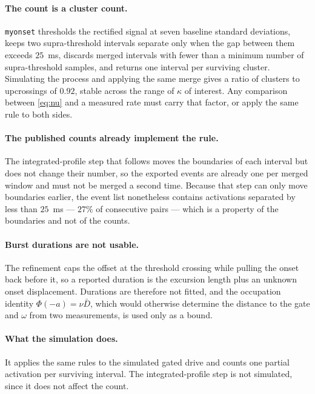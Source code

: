 \documentclass[a4paper,11pt]{article}
\newcommand{\1}{\mathbbm{1}}
\begin{document}
\paragraph{The count is a cluster count.} \texttt{myonset} thresholds the rectified
signal at seven baseline standard deviations, keeps two supra-threshold intervals
separate only when the gap between them exceeds $25$~ms, discards merged intervals with
fewer than a minimum number of supra-threshold samples, and returns one interval per
surviving cluster. Simulating the process and applying the same merge gives a ratio of
clusters to upcrossings of $0.92$, stable across the range of $\kappa$ of interest. Any
comparison between \eqref{eq:nu} and a measured rate must carry that factor, or apply the
same rule to both sides.

\paragraph{The published counts already implement the rule.} The integrated-profile step
that follows moves the boundaries of each interval but does not change their number, so
the exported events are already one per merged window and must not be merged a second
time. Because that step can only move boundaries earlier, the event list nonetheless
contains activations separated by less than $25$~ms --- $27\%$ of consecutive pairs ---
which is a property of the boundaries and not of the counts.

\paragraph{Burst durations are not usable.} The refinement caps the offset at the
threshold crossing while pulling the onset back before it, so a reported duration is the
excursion length plus an unknown onset displacement. Durations are therefore not fitted,
and the occupation identity $\Phi(-a)=\nu\bar D$, which would otherwise determine the
distance to the gate and $\omega$ from two measurements, is used only as a bound.

\paragraph{What the simulation does.} It applies the same rules to the simulated gated
drive and counts one partial activation per surviving interval. The integrated-profile
step is not simulated, since it does not affect the count.

\end{document}
